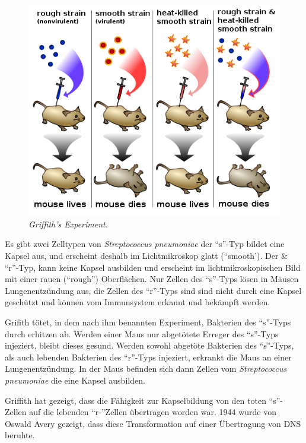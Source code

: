 \begin{enumerate}
	\begin{figure}[ht!]
	\leavevmode
	\begin{center}
	\includegraphics[scale=0.47]{./pictures/griffith_exp_500}
	\end{center}
	\caption{\slshape{Griffith's Experiment.}}
	\label{fig:griffith}
	\end{figure}

	Es gibt zwei Zelltypen von \emph{Streptococcus pneumoniae} der ``s''-Typ
	bildet eine Kapsel aus, und erscheint deshalb im Lichtmikroskop glatt (``smooth').
	Der \& ``r''-Typ, kann keine Kapsel ausbilden und erscheint im lichtmikroskopischen Bild
	mit einer rauen (``rough'') Oberflächen.
	Nur Zellen des ``s''-Typs lösen in Mäusen Lungenentzündung aus,
	die Zellen des ``r''-Typs sind sind nicht durch eine Kapsel geschützt und können
	vom Immunsystem erkannt und bekämpft werden.

	Grifith tötet, in dem nach ihm benannten Experiment,
	Bakterien des ``s''-Typs durch erhitzen ab.
	Werden einer Maus nur abgetötete Erreger des ``s''-Typs injeziert,
	bleibt dieses gesund.
	Werden sowohl abgetöte Bakterien des ``s''-Typs,
	als auch lebenden Bakterien des ``r''-Typs injeziert,
	erkrankt die Maus an einer Lungenentzündung.
	In der Maus befinden sich dann Zellen vom \emph{Streptococcus pneumoniae} 
	die eine Kapsel ausbilden.

	Griffith hat gezeigt, dass die Fähigkeit zur Kapselbildung von den toten ``s''-Zellen
	auf die lebenden ``r-''Zellen übertragen worden war.
	1944 wurde von Oswald Avery gezeigt,
	dass diese Transformation auf einer Übertragung von DNS beruhte.



\end{enumerate}
